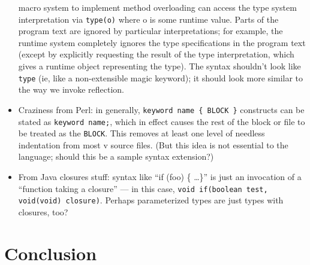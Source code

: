 \documentclass[11pt,notitlepage,twocolumn]{article}
\newcommand{\vlang}{\textsf{v}\xspace}
\begin{document}
\begin{itemize}
  macro system to implement method overloading can access the type
  system interpretation via \texttt{type(o)} where o is some runtime
  value.  Parts of the program text are ignored by particular
  interpretations; for example, the runtime system completely ignores
  the type specifications in the program text (except by explicitly
  requesting the result of the type interpretation, which gives
  a runtime object representing the type).  The syntax shouldn't look
  like \texttt{type} (ie, like a non-extensible magic keyword); it
  should look more similar to the way we invoke reflection.
\item Craziness from Perl: in generally, \texttt{keyword name \{ BLOCK \}}
  constructs can be stated as \texttt{keyword name;}, which in effect
  causes the rest of the block or file to be treated as the \texttt{BLOCK}.
  This removes at least one level of needless indentation from most
  \vlang source files. (But this idea is not essential to the
  language; should this be a sample syntax extension?)
\item From Java closures stuff: syntax like ``if (foo) \{ \ldots \}'' is
  just an invocation of a ``function taking a closure'' --- in this case,
  \texttt{void if(boolean test, void(void) closure)}.  Perhaps parameterized
  types are just types with closures, too?
\end{itemize}

\section{Conclusion}


\end{document}
